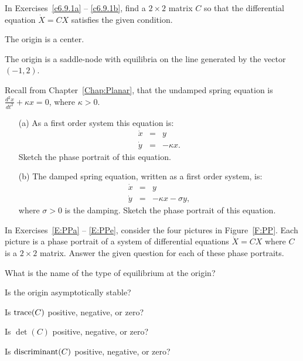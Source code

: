 \documentclass{ximera}
\begin{document}
\EXER

\TEXER

\noindent In Exercises~\ref{c6.9.1a} -- \ref{c6.9.1b}, find a $2\times 2$
matrix $C$ so that the differential equation $\dot{X}=CX$ satisfies the
given condition.
\begin{exercise} \label{c6.9.1a}
The origin is a center.
\end{exercise}
\begin{exercise} \label{c6.9.1b}
The origin is a saddle-node with equilibria on the line generated by the
vector $(-1,2)$.
\end{exercise}

\begin{exercise} \label{c6.9.2}
Recall from Chapter~\ref{Chap:Planar},  that the undamped
spring equation is $\frac{d^2x}{dt^2} + \kappa x = 0$, where $\kappa>0$.
\begin{itemize}
\item[(a)]   As a first order system this equation is:
\begin{eqnarray*}
\dot{x} & = & y \\
\dot{y} & = & -\kappa x.
\end{eqnarray*}
Sketch the phase portrait of this equation.
\item[(b)]  The damped spring equation, written as a first order system, is:
\begin{eqnarray*}
\dot{x} & = & y \\
\dot{y} & = & -\kappa x-\sigma y,
\end{eqnarray*}
where $\sigma>0$ is the damping.  Sketch the phase portrait of this equation.
\end{itemize}
\end{exercise}

\noindent In Exercises~\ref{E:PPa} -- \ref{E:PPe}, consider the four pictures
in Figure~\ref{F:PP}.  Each picture is a phase portrait of a system of
differential equations $\dot{X}=CX$ where $C$ is a $2\times 2$ matrix.  Answer
the given question for each of these phase portraits.
\begin{exercise}  \label{E:PPa}
What is the name of the type of equilibrium at the origin?
\end{exercise}
\begin{exercise}  \label{E:PPb}
Is the origin asymptotically stable?
\end{exercise}
\begin{exercise}  \label{E:PPc}
Is ${\rm trace}(C)$ positive, negative, or zero?
\end{exercise}
\begin{exercise}  \label{E:PPd}
Is $\det(C)$ positive, negative, or zero?
\end{exercise}
\begin{exercise}  \label{E:PPe}
Is ${\rm discriminant}(C)$ positive, negative, or zero?
\end{exercise}
\end{document}
